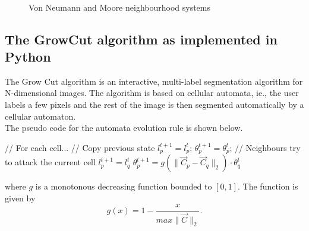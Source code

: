 \documentclass[a4paper,10pt]{article}
\begin{document}
\begin{figure}[H]
\centering
\mbox{ \quad
{}} \caption{Von Neumann and Moore neighbourhood systems}
\end{figure}

\subsection{The GrowCut algorithm as implemented in Python}
The Grow Cut algorithm is an interactive, multi-label segmentation algorithm for N-dimensional images.  The algorithm is based on cellular automata, ie.,  the user labels a few pixels and the rest of the image is then segmented automatically by a cellular automaton. \\

\noindent The pseudo code for the automata evolution rule is shown below. 
\begin{algorithm}[H]
\begin{algorithmic}[1]
 \State // For each cell...
 \State // Copy previous state
 \State $l^{t+1}_{p} = l^{t}_{p}$;
 \State $\theta_{p}^{t+1} = \theta_{p}^{t}$;
 \State // Neighbours try to attack the current cell
 \State $l^{t+1}_{p} = l^{t}_{q}$
 \State $\theta^{t+1}_{p} = g(\| \overrightarrow{C}_{p} - \overrightarrow{C}_{q} \|_{2}) \cdot \theta^{t}_{q}$
 \EndIf
 \EndFor
 \EndFor
\end{algorithmic}
\end{algorithm}

\noindent where $g$ is a monotonous decreasing function bounded to $[0, 1]$.  The function is given by
\[
g(x) = 1 - \frac{x}{max\| \overrightarrow{C} \|_{2}}. 
\]
\end{document}
